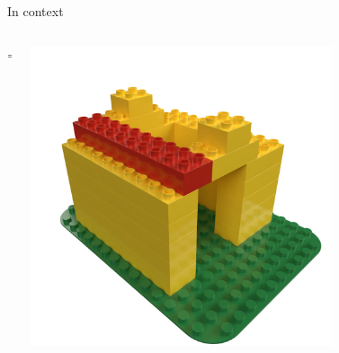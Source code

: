 \begin{frame}{In context}
\begin{columns}[c]
\begin{column}{0.05\textwidth}
            \centering
            =
        \end{column}\begin{column}{0.3\textwidth}
            \centering
            \includegraphics[width=0.7\textwidth]{images/03_transformation_framework/duplo_house_roof_step.png}
        \end{column}
    \end{columns} 
\end{frame}

